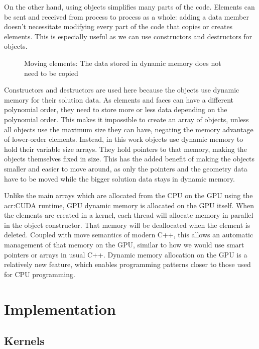 On the other hand, using objects simplifies many parts of the code. Elements can be sent and
received from process to process as a whole: adding a data member doesn't necessitate modifying
every part of the code that copies or creates elements. This is especially useful as we can use
constructors and destructors for objects.

\begin{figure}[H]
	\centering
	
	\caption{Moving elements: The data stored in dynamic memory does not need to be copied}
	\label{fig:moving_elements}
\end{figure}

Constructors and destructors are used here because the objects use dynamic memory for their solution
data. As elements and faces can have a different polynomial order, they need to store more or less
data depending on the polynomial order. This makes it impossible to create an array of objects,
unless all objects use the maximum size they can have, negating the memory advantage of lower-order
elements. Instead, in this work objects use dynamic memory to hold their variable size arrays. They
hold pointers to that memory, making the objects themselves fixed in size. This has the added
benefit of making the objects smaller and easier to move around, as only the pointers and the
geometry data have to be moved while the bigger solution data stays in dynamic memory. 

Unlike the main arrays which are allocated from the CPU on the GPU using the \acrshort{acr:CUDA}
runtime, GPU dynamic memory is allocated on the GPU itself. When the elements are created in a
kernel, each thread will allocate memory in parallel in the object constructor. That memory will be
deallocated when the element is deleted. Coupled with move semantics of modern C++, this allows an
automatic management of that memory on the GPU, similar to how we would use smart pointers or arrays
in usual C++. Dynamic memory allocation on the GPU is a relatively new feature, which enables
programming patterns closer to those used for CPU programming.

\section{Implementation} \label{section:graphics_processing_units:implementation}

\subsection{Kernels} \label{subsection:graphics_processing_units:implementation:kernels}

